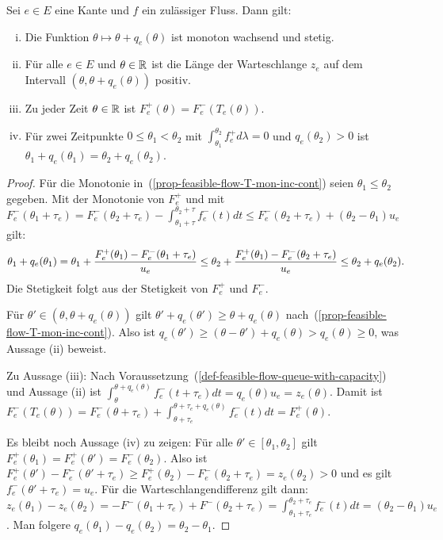 \begin{proposition}\label{prop-feasible-flow}
	Sei $e\in E$ eine Kante und $f$ ein zulässiger Fluss. Dann gilt:
	\begin{enumerate}[(i)]
		\item\label{prop-feasible-flow-T-mon-inc-cont} Die Funktion $\theta \mapsto \theta + q_e(\theta)$ ist monoton wachsend und stetig.
		\item\label{prop-feasible-flow-positive-queue} Für alle $e\in E$ und $\theta\in\mathbb{R}$ ist die Länge der Warteschlange $z_e$ auf dem Intervall $(\theta, \theta + q_e(\theta))$ positiv.
		\item\label{prop-feasible-flow-det-outflow} Zu jeder Zeit $\theta\in\mathbb{R}$ ist $F_e^+(\theta) = F_e^-(T_e(\theta))$.
		\item\label{prop-feasible-flow-queue-delay} Für zwei Zeitpunkte $0\leq \theta_1 < \theta_2$ mit $\int_{\theta_1}^{\theta_2} f^+_e d\lambda = 0$ und $q_e(\theta_2)>0$ ist $\theta_1 + q_e(\theta_1) = \theta_2 + q_e(\theta_2)$.
	\end{enumerate}
\end{proposition}
\begin{proof}
	Für die Monotonie in~(\ref{prop-feasible-flow-T-mon-inc-cont}) seien $\theta_1 \leq \theta_2$ gegeben.
	Mit der Monotonie von $F_e^+$ und mit $F_e^-(\theta_1 + \tau_e) = F_e^-(\theta_2+\tau_e) - \int_{\theta_1+\tau}^{\theta_2+\tau} f_e^-(t)dt\leq F_e^-(\theta_2 + \tau_e) + (\theta_2 - \theta_1)u_e$ gilt: 
	$$
		\theta_1 + q_e(\theta_1)
		= \theta_1 + \frac{F_e^+(\theta_1) - F_e^-(\theta_1 + \tau_e)}{u_e}\\
		\leq \theta_2 + \frac{F_e^+(\theta_1) - F_e^-(\theta_2+\tau_e)}{u_e} \leq \theta_2 + q_e(\theta_2).
	$$
	Die Stetigkeit folgt aus der Stetigkeit von $F_e^+$ und $F_e^-$.
	
	Für $\theta'\in (\theta, \theta+q_e(\theta))$ gilt $\theta' + q_e(\theta') \geq \theta + q_e(\theta)$ nach~(\ref{prop-feasible-flow-T-mon-inc-cont}).
	Also ist $q_e(\theta') \geq (\theta - \theta') + q_e(\theta) > q_e(\theta)\geq 0$, was Aussage (ii) beweist.	
	
	Zu Aussage (iii): Nach Voraussetzung~(\ref{def-feasible-flow-queue-with-capacity}) und Aussage (ii) ist
	$\int_{\theta}^{\theta + q_e(\theta)}f_e^-(t + \tau_e) dt = q_e(\theta)  u_e = z_e(\theta)$.
	Damit ist $F_e^-(T_e(\theta)) = F_e^-(\theta+\tau_e) + \int_{\theta+\tau_e}^{\theta+\tau_e+q_e(\theta)}f_e^-(t)dt = F_e^+(\theta)$.
	
	Es bleibt noch Aussage (iv) zu zeigen:
	Für alle $\theta'\in [\theta_1, \theta_2]$ gilt $F_e^+(\theta_1) = F_e^+(\theta') = F_e^-(\theta_2)$.
	Also ist $F_e^+(\theta') - F_e^-(\theta' + \tau_e) \geq F_e^+(\theta_2)-F_e^-(\theta_2 + \tau_e) = z_e(\theta_2) > 0$ und es gilt $f_e^-(\theta' + \tau_e)=u_e$.
	Für die Warteschlangendifferenz gilt dann: 
	$z_e(\theta_1)-z_e(\theta_2)=-F^-(\theta_1 + \tau_e) + F^-(\theta_2 + \tau_e) = \int_{\theta_1 + \tau_e}^{\theta_2 + \tau_e} f^-_e(t) dt = (\theta_2 - \theta_1)u_e$.
	Man folgere $q_e(\theta_1) - q_e(\theta_2) = \theta_2 - \theta_1$.
\end{proof}

